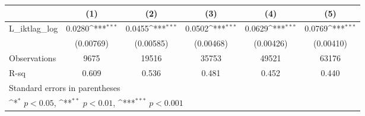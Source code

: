 {
\def\sym#1{\ifmmode^{#1}\else\(^{#1}\)\fi}
\begin{tabular}{l*{5}{c}}
\hline\hline
                &\multicolumn{1}{c}{(1)}         &\multicolumn{1}{c}{(2)}         &\multicolumn{1}{c}{(3)}         &\multicolumn{1}{c}{(4)}         &\multicolumn{1}{c}{(5)}         \\
\hline
L\_iktlag\_log    &   0.0280\sym{***}&   0.0455\sym{***}&   0.0502\sym{***}&   0.0629\sym{***}&   0.0769\sym{***}\\
                &(0.00769)         &(0.00585)         &(0.00468)         &(0.00426)         &(0.00410)         \\
\hline
Observations    &     9675         &    19516         &    35753         &    49521         &    63176         \\
R-sq            &    0.609         &    0.536         &    0.481         &    0.452         &    0.440         \\
\hline\hline
\multicolumn{6}{l}{\footnotesize Standard errors in parentheses}\\
\multicolumn{6}{l}{\footnotesize \sym{*} \(p<0.05\), \sym{**} \(p<0.01\), \sym{***} \(p<0.001\)}\\
\end{tabular}
}
